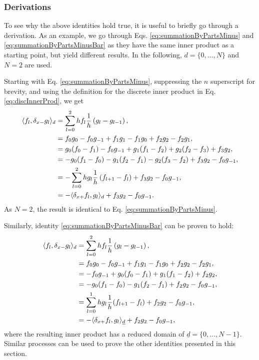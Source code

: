 \subsubsection{Derivations}
To see why the above identities hold true, it is useful to briefly go through a derivation. As an example, we go through Eqs. \eqref{eq:summationByPartsMinus} and \eqref{eq:summationByPartsMinusBar} as they have the same inner product as a starting point, but yield different results. In the following, $d=\{0, \hdots, N\}$ and $N = 2$ are used. 

Starting with Eq. \eqref{eq:summationByPartsMinus}, suppressing the $n$ superscript for brevity, and using the definition for the discrete inner product in Eq. \eqref{eq:discInnerProd}, we get 
\begin{align*}
    \langle f_l, \delta_{x-} g_l \rangle_d &= \sum_{l = 0}^2 h f_l\frac{1}{h}\left(g_l - g_{l-1}\right),\\
    &= f_0g_0 - f_0g_{-1} + f_1g_1 - f_1g_0 + f_2g_2-f_2g_1,\\
    &= g_0(f_0-f_1) - f_0g_{-1} + g_1(f_1-f_2) + g_2(f_2-f_3) + f_3g_2,\\
    &= -g_0(f_1-f_0)- g_1(f_2-f_1) - g_2(f_3-f_2) + f_3g_2 - f_0g_{-1},\\
    &= -\sum_{l=0}^2 h g_l\frac{1}{h}\left(f_{l+1} - f_l\right) + f_3g_2 - f_0g_{-1},\\
    &= -\langle \delta_{x+} f_l, g_l\rangle_d + f_3g_2 - f_0g_{-1}.
\end{align*}
As $N=2$, the result is identical to Eq. \eqref{eq:summationByPartsMinus}. 

Similarly, identity \eqref{eq:summationByPartsMinusBar} can be proven to hold:
\begin{align*}
    \langle f_l, \delta_{x-} g_l \rangle_d &= \sum_{l = 0}^2 h f_l\frac{1}{h}\left(g_l - g_{l-1}\right),\\
    &= f_0g_0 - f_0g_{-1} + f_1g_1 - f_1g_0 + f_2g_2-f_2g_1,\\
    &= -f_0g_{-1} + g_0(f_0-f_1) + g_1(f_1-f_2) + f_2g_2,\\
    &= - g_0(f_1 - f_0) - g_1(f_2-f_1) + f_2g_2 - f_0g_{-1},\\
    &=\sum_{l=0}^1hg_l\frac{1}{h}(f_{l+1}-f_l) + f_2g_2 - f_0g_{-1},\\
    &= -\langle \delta_{x+} f_l, g_l\rangle_{\underline{d}} + f_2g_2 - f_0g_{-1},
\end{align*}
where the resulting inner product has a reduced domain of $\underline{d} = \{0, \hdots, N-1\}$.
Similar processes can be used to prove the other identities presented in this section.

